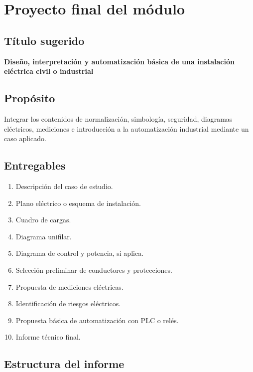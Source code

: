 \documentclass[
  spanish,
  letterpaper,
  DIV=11,
  numbers=noendperiod]{scrreprt}
\providecommand{\tightlist}{%
  \setlength{\itemsep}{0pt}\setlength{\parskip}{0pt}}
\begin{document}

\chapter{Proyecto final del módulo}\label{proyecto-final-del-muxf3dulo}

\section{Título sugerido}\label{tuxedtulo-sugerido}

\textbf{Diseño, interpretación y automatización básica de una
instalación eléctrica civil o industrial}

\section{Propósito}\label{propuxf3sito}

Integrar los contenidos de normalización, simbología, seguridad,
diagramas eléctricos, mediciones e introducción a la automatización
industrial mediante un caso aplicado.

\section{Entregables}\label{entregables}

\begin{enumerate}
\def\labelenumi{\arabic{enumi}.}
\tightlist
\item
  Descripción del caso de estudio.
\item
  Plano eléctrico o esquema de instalación.
\item
  Cuadro de cargas.
\item
  Diagrama unifilar.
\item
  Diagrama de control y potencia, si aplica.
\item
  Selección preliminar de conductores y protecciones.
\item
  Propuesta de mediciones eléctricas.
\item
  Identificación de riesgos eléctricos.
\item
  Propuesta básica de automatización con PLC o relés.
\item
  Informe técnico final.
\end{enumerate}

\section{Estructura del informe}\label{estructura-del-informe}
\end{document}

